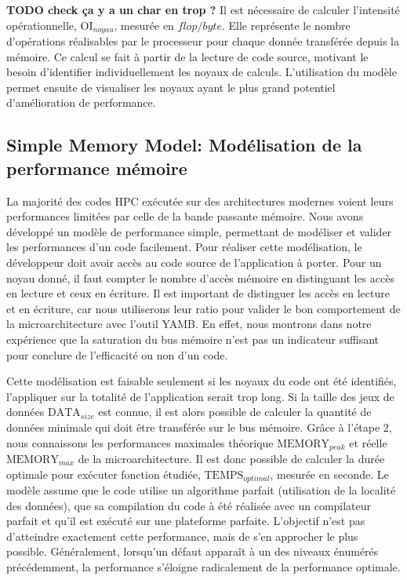  
 \textbf{TODO check ça y a un char en trop ?}   
    Il est nécessaire de calculer l'intensité opérationnelle, $\text{OI}_{noyau}$, mesurée en $flop/byte$. Elle représente le nombre d'opérations réalisables par le processeur pour chaque donnée transférée depuis la mémoire. Ce calcul se fait à partir de la lecture de code source, motivant le besoin d'identifier individuellement les noyaux de calculs. 
    L'utilisation du modèle permet ensuite de visualiser les noyaux ayant le plus grand potentiel d'amélioration de performance. 


\subsection{Simple Memory Model: Modélisation de la performance mémoire} \label{sec:smm}

    La majorité des codes HPC exécutée sur des architectures modernes voient leurs performances limitées par celle de la bande passante mémoire. Nous avons développé un modèle de performance simple, permettant de modéliser et valider les performances d'un code facilement. Pour réaliser cette modélisation, le développeur doit avoir accès au code source de l'application à porter. Pour un noyau donné, il faut compter le nombre d'accès mémoire en distinguant les accès en lecture et ceux en écriture. Il est important de distinguer les accès en lecture et en écriture, car nous utiliserons leur ratio pour valider le bon comportement de la microarchitecture avec l'outil YAMB. En effet, nous montrons dans notre expérience que la saturation du bus mémoire n'est pas un indicateur suffisant pour conclure de l'efficacité ou non d'un code.
    
    Cette modélisation est faisable seulement si les noyaux du code ont été identifiés, l'appliquer sur la totalité de l'application serait trop long. Si la taille des jeux de données $\text{DATA}_{size}$ est connue, il est alors possible de calculer la quantité de données minimale qui doit être transférée sur le bus mémoire. Grâce à l'étape 2, nous connaissons les performances maximales théorique $\text{MEMORY}_{peak}$ et réelle $\text{MEMORY}_{max}$ de la microarchitecture. Il est donc possible de calculer la durée optimale pour exécuter fonction étudiée, $\text{TEMPS}_{optimal}$, mesurée en seconde. Le modèle assume que le code utilise un algorithme parfait (utilisation de la localité des données), que sa compilation du code à été réalisée avec un compilateur parfait et qu'il est exécuté sur une plateforme parfaite. L'objectif n'est pas d'atteindre exactement cette performance, mais de s'en approcher le plus possible. Généralement, lorsqu'un défaut apparaît à un des niveaux énumérés précédemment, la performance s'éloigne radicalement de la performance optimale.
    
